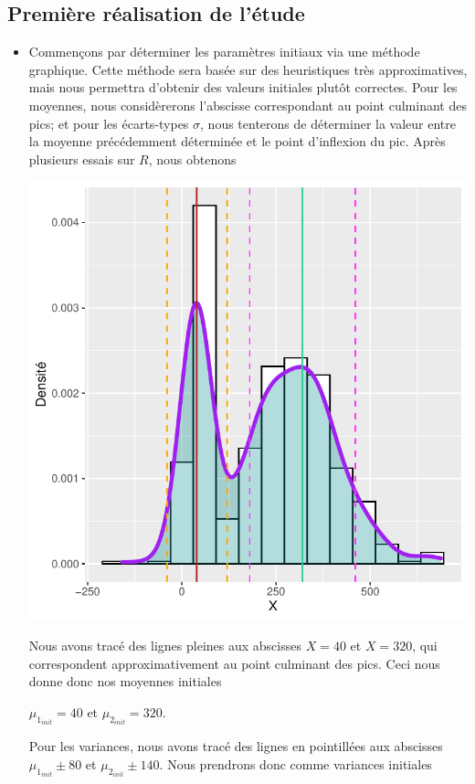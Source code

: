 \documentclass[frenchb]{report}
\newcommand{\1}{\mathbbm{1}}
\theoremstyle{definition}\newtheorem{defn}{Définition}
\theoremstyle{definition}\newtheorem{exm}{Exemple}
\theoremstyle{definition}\newtheorem{nota}{Notation}
\theoremstyle{definition}\newtheorem{rem}{Remarque}
\begin{document}
\subsection{Première réalisation de l'étude}
\begin{itemize}[label=\adfflowerleft]
\item
Commençons par déterminer les paramètres initiaux via une méthode graphique. Cette méthode sera basée sur des heuristiques très approximatives, mais nous permettra d'obtenir des valeurs initiales plutôt correctes. \newline
Pour les moyennes, nous considèrerons l'abscisse correspondant au point culminant des pics; et pour les écarts-types $\sigma$, nous tenterons de déterminer la valeur entre la moyenne précédemment déterminée et le point d'inflexion du pic. Après plusieurs essais sur $R$, nous obtenons
\begin{center}
\includegraphics[scale=0.8]{dens_1bis.pdf}
\end{center}
Nous avons tracé des lignes pleines aux abscisses $X=40$ et $X=320$, qui correspondent approximativement au point culminant des pics. Ceci nous donne donc nos moyennes initiales 
\begin{center} 
$\mu_{1_{init}} =  40$ et $\mu_{2_{init}} = 320$. 
\end{center}
Pour les variances, nous avons tracé des lignes en pointillées aux abscisses $\mu_{1_{init}} \pm 80$ et $\mu_{2_{init}} \pm 140$. Nous prendrons donc comme variances initiales 

\end{itemize}
\end{document}
